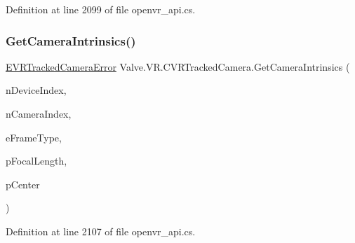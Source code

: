 Definition at line 2099 of file openvr\+\_\+api.\+cs.

\mbox{\label{class_valve_1_1_v_r_1_1_c_v_r_tracked_camera_a14c0112fec4074fee9eb035bd0341823}} 
\subsubsection{\texorpdfstring{GetCameraIntrinsics()}{GetCameraIntrinsics()}}
{\footnotesize\ttfamily \mbox{\hyperlink{namespace_valve_1_1_v_r_ad0e012e846f5d93848783c044614cfd3}{E\+V\+R\+Tracked\+Camera\+Error}} Valve.\+V\+R.\+C\+V\+R\+Tracked\+Camera.\+Get\+Camera\+Intrinsics (\begin{DoxyParamCaption}\item[{uint}]{n\+Device\+Index,  }\item[{uint}]{n\+Camera\+Index,  }\item[{\mbox{\hyperlink{namespace_valve_1_1_v_r_a9962211bc3fe98c2683db188c12c9afd}{E\+V\+R\+Tracked\+Camera\+Frame\+Type}}}]{e\+Frame\+Type,  }\item[{ref \mbox{\hyperlink{struct_valve_1_1_v_r_1_1_hmd_vector2__t}{Hmd\+Vector2\+\_\+t}}}]{p\+Focal\+Length,  }\item[{ref \mbox{\hyperlink{struct_valve_1_1_v_r_1_1_hmd_vector2__t}{Hmd\+Vector2\+\_\+t}}}]{p\+Center }\end{DoxyParamCaption})}



Definition at line 2107 of file openvr\+\_\+api.\+cs.

\mbox{\label{class_valve_1_1_v_r_1_1_c_v_r_tracked_camera_af89b991a4c7e27dee9a0c01cc2bcd30f}} 
